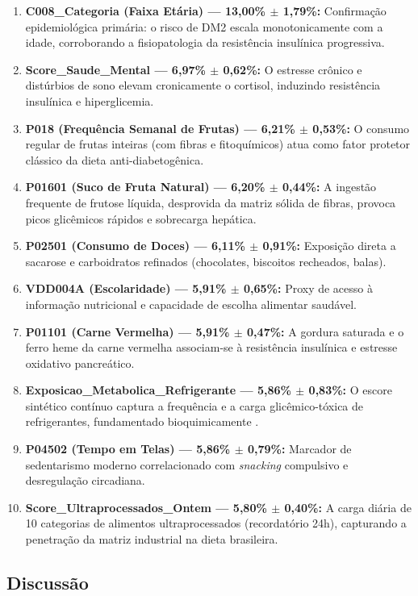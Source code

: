 \documentclass[12pt, a4paper]{article}
\begin{document}
    \begin{enumerate}
        \item \textbf{C008\_Categoria (Faixa Etária) — 13,00\% $\pm$ 1,79\%:} Confirmação epidemiológica primária: o risco de DM2 escala monotonicamente com a idade, corroborando a fisiopatologia da resistência insulínica progressiva.
        \item \textbf{Score\_Saude\_Mental — 6,97\% $\pm$ 0,62\%:} O estresse crônico e distúrbios de sono elevam cronicamente o cortisol, induzindo resistência insulínica e hiperglicemia.
        \item \textbf{P018 (Frequência Semanal de Frutas) — 6,21\% $\pm$ 0,53\%:} O consumo regular de frutas inteiras (com fibras e fitoquímicos) atua como fator protetor clássico da dieta anti-diabetogênica.
        \item \textbf{P01601 (Suco de Fruta Natural) — 6,20\% $\pm$ 0,44\%:} A ingestão frequente de frutose líquida, desprovida da matriz sólida de fibras, provoca picos glicêmicos rápidos e sobrecarga hepática.
        \item \textbf{P02501 (Consumo de Doces) — 6,11\% $\pm$ 0,91\%:} Exposição direta a sacarose e carboidratos refinados (chocolates, biscoitos recheados, balas).
        \item \textbf{VDD004A (Escolaridade) — 5,91\% $\pm$ 0,65\%:} Proxy de acesso à informação nutricional e capacidade de escolha alimentar saudável.
        \item \textbf{P01101 (Carne Vermelha) — 5,91\% $\pm$ 0,47\%:} A gordura saturada e o ferro heme da carne vermelha associam-se à resistência insulínica e estresse oxidativo pancreático.
        \item \textbf{Exposicao\_Metabolica\_Refrigerante — 5,86\% $\pm$ 0,83\%:} O escore sintético contínuo captura a frequência e a carga glicêmico-tóxica de refrigerantes, fundamentado bioquimicamente \cite{campos2023investigacao}.
        \item \textbf{P04502 (Tempo em Telas) — 5,86\% $\pm$ 0,79\%:} Marcador de sedentarismo moderno correlacionado com \textit{snacking} compulsivo e desregulação circadiana.
        \item \textbf{Score\_Ultraprocessados\_Ontem — 5,80\% $\pm$ 0,40\%:} A carga diária de 10 categorias de alimentos ultraprocessados (recordatório 24h), capturando a penetração da matriz industrial na dieta brasileira.
    \end{enumerate}

    \subsection{Discussão}
\end{document}
